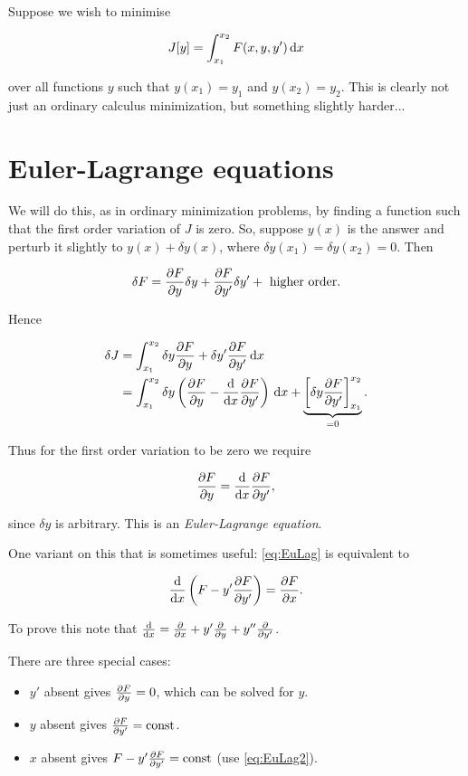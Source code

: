 \documentclass{notes}
\theoremstyle{plain}
\begin{document}
Suppose we wish to minimise

\begin{equation}\label{eq:CoVprob}
J[y] = \int_{x_1}^{x_2} F(x,y,y')\, \mathrm{d} x
\end{equation}

over all functions $y$ such that $y(x_1) = y_1$ and $y(x_2) = y_2$.
This is clearly not just an ordinary calculus minimization, but
something slightly harder...

\section{Euler-Lagrange equations}

We will do this, as in ordinary minimization problems, by finding a
function such that the first order variation of $J$ is zero.  So,
suppose $y(x)$ is the answer and perturb it slightly to $y(x) + \delta
y(x)$, where $\delta y(x_1) = \delta y(x_2) = 0$.  Then

\[
\delta F = \frac{\partial F}{\partial y} \delta y + \frac{\partial F}{\partial y'} \delta y' + \text{ higher order.}
\]

Hence

\begin{align*}
\delta J &= \int_{x_1}^{x_2} \delta y \frac{\partial F}{\partial y} + \delta y'
\frac{\partial F}{\partial y'}\, \mathrm{d} x \\
&= \int_{x_1}^{x_2} \delta y \left(\frac{\partial F}{\partial y} - \frac{\mathrm{d}}{\mathrm{d} x} \frac{\partial F}{\partial y'}
\right)\, \mathrm{d} x +
\underbrace{\left[ \delta y \frac{\partial F}{\partial y'}\right]_{x_1}^{x_2}}_{ = 0}.
\end{align*}

Thus for the first order variation to be zero we require

\begin{equation}\label{eq:EuLag}
\frac{\partial F}{\partial y} = \frac{\mathrm{d}}{\mathrm{d} x} \frac{\partial F}{\partial y'},
\end{equation}

since $\delta y$ is arbitrary.  This is an \emph{Euler-Lagrange
  equation}.

One variant on this that is sometimes useful: \eqref{eq:EuLag} is
equivalent to

\begin{equation}\label{eq:EuLag2}
\frac{\mathrm{d}}{\mathrm{d} x} \left( F - y' \frac{\partial F}{\partial y'} \right) = \frac{\partial F}{\partial x}.
\end{equation}

To prove this note that $\frac{\mathrm{d}}{\mathrm{d} x} = \frac{\partial }{\partial x} + y' \frac{\partial }{\partial y} + y'' \frac{\partial }{\partial y'}$.

There are three special cases:

\begin{itemize}
\item $y'$ absent gives $\frac{\partial F}{\partial y} = 0$, which can be solved
  for $y$.
\item $y$ absent gives $\frac{\partial F}{\partial y'} = \text{const}$.
\item $x$ absent gives $F - y' \frac{\partial F}{\partial y'} = \text{const}$ (use
  \eqref{eq:EuLag2}).
\end{itemize}
\end{document}
